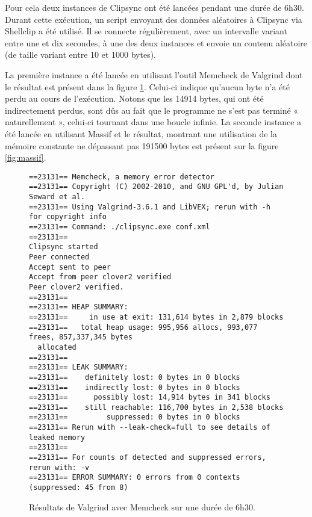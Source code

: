 Pour cela deux instances de Clipsync ont été lancées pendant une durée
de 6h30. Durant cette exécution, un script envoyant des données aléatoires
à Clipsync via Shellclip a été utilisé. Il se connecte régulièrement, avec
un intervalle variant entre une et dix secondes, à une des deux instances et
envoie un contenu aléatoire (de taille variant entre 10 et 1000 bytes).

La première instance a été lancée en utilisant l'outil
Memcheck de Valgrind dont le résultat est présent dans la figure
\ref{fig:memcheck}. Celui-ci indique qu'aucun byte n'a été perdu au cours
de l'exécution. Notons que les 14914 bytes, qui ont été indirectement perdus,
sont dûs au fait que le programme ne s'est pas terminé « naturellement »,
celui-ci tournant dans une boucle infinie.
La seconde instance a été lancée en utilisant Massif et le résultat,
montrant une utilisation de la mémoire constante ne dépassant pas 191500
bytes est présent sur la figure \ref{fig:massif}.

\begin{figure}[!h]
  \centering
  \scriptsize{
\begin{verbatim}
==23131== Memcheck, a memory error detector
==23131== Copyright (C) 2002-2010, and GNU GPL'd, by Julian Seward et al.
==23131== Using Valgrind-3.6.1 and LibVEX; rerun with -h for copyright info
==23131== Command: ./clipsync.exe conf.xml
==23131==
Clipsync started
Peer connected
Accept sent to peer
Accept from peer clover2 verified
Peer clover2 verified.
==23131==
==23131== HEAP SUMMARY:
==23131==     in use at exit: 131,614 bytes in 2,879 blocks
==23131==   total heap usage: 995,956 allocs, 993,077 frees, 857,337,345 bytes
  allocated
==23131==
==23131== LEAK SUMMARY:
==23131==    definitely lost: 0 bytes in 0 blocks
==23131==    indirectly lost: 0 bytes in 0 blocks
==23131==      possibly lost: 14,914 bytes in 341 blocks
==23131==    still reachable: 116,700 bytes in 2,538 blocks
==23131==         suppressed: 0 bytes in 0 blocks
==23131== Rerun with --leak-check=full to see details of leaked memory
==23131==
==23131== For counts of detected and suppressed errors, rerun with: -v
==23131== ERROR SUMMARY: 0 errors from 0 contexts (suppressed: 45 from 8)
\end{verbatim}
  }
  \caption{Résultats de Valgrind avec Memcheck sur une durée de 6h30.}
  \label{fig:memcheck}
\end{figure}

